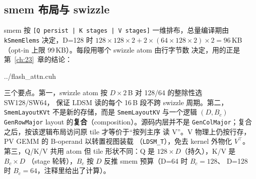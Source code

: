 \subsection{smem 布局与 swizzle}\label{sec:26b-smem}

smem 按 \texttt{[Q persist | K stages | V stages]} 一维排布，总量编译期由
\texttt{kSmemElems} 决定，D=128 时 $128{\times}128{\times}2 + 2{\times}(64{\times}128{\times}2)
\times 2 = 96$\,KB（opt-in 上限 99\,KB）。每段用哪个 swizzle atom 由行字节数
决定，用的正是第~\ref{ch:23}~章的结论：

\begin{lstinputlisting}[linerange={3527-3565},firstnumber=auto,
  title={flash\_attn.cuh L3527-3565（\texttt{Flash\allowbreak{}Attn\allowbreak{}Persist\allowbreak{}D\allowbreak{}Cu\allowbreak{}Te\allowbreak{}Traits}：smem 布局与双 TiledMma）}]{../flash_attn.cuh}
\end{lstinputlisting}

三个要点。第一，swizzle atom 按 $D\times 2$\,B 对 128/64 的整除性选 SW128/SW64，
保证 LDSM 读的每个 16\,B 段不跨 swizzle 周期。第二，\texttt{Smem\allowbreak{}Layout\allowbreak{}KVt}
不是新的存储，而是 \texttt{SmemLayoutKV} 与一个逻辑 $(D, B_c)$
\texttt{GenRowMajor} layout 的\textbf{复合}（composition）。源码内层并不是
\texttt{GenColMajor}；复合之后，按该逻辑布局访问原 tile 才等价于“按列主序
读 V”。V 物理上仍按行存，PV GEMM 的 B-operand 以转置视图装载
（\texttt{LDSM\_T}），免去 kernel 外物化 $V^\top$。第三，Q/K/V 共用
atom 但 tile 形状不同：Q 是 $128\times D$（持久），K/V 是 $B_c\times D$
（stage 轮转），$B_c$ 按 $D$ 反推 smem 预算（D=64 时 $B_c{=}128$、
D=128 时 $B_c{=}64$，注释里给出了计算）。

